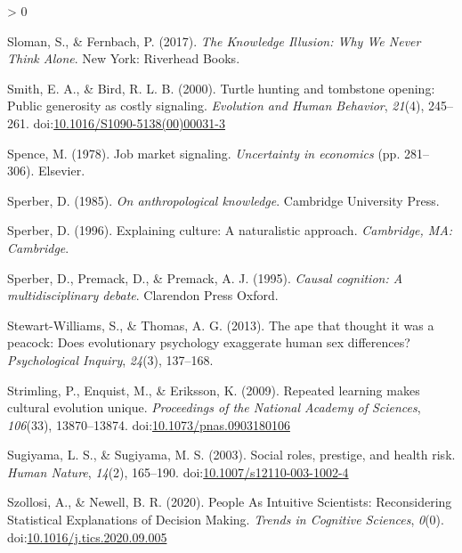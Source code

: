 \documentclass[
  11pt,
]{article}
\newlength{\cslhangindent}
\newenvironment{CSLReferences}[2] %
 {%
  \setlength{\parindent}{0pt}
  \ifodd #1 \everypar{\setlength{\hangindent}{\cslhangindent}}\ignorespaces\fi
  \ifnum #2 > 0
  \setlength{\parskip}{#2\baselineskip}
  \fi
 }%
 {}
\begin{document}
\begin{CSLReferences}{1}{0}
\leavevmode\hypertarget{ref-slomanKnowledgeIllusionWhy2017a}{}%
Sloman, S., \& Fernbach, P. (2017). \emph{The {Knowledge Illusion}: {Why We Never Think Alone}}. {New York}: {Riverhead Books}.

\leavevmode\hypertarget{ref-smithTurtleHuntingTombstone2000}{}%
Smith, E. A., \& Bird, R. L. B. (2000). Turtle hunting and tombstone opening: Public generosity as costly signaling. \emph{Evolution and Human Behavior}, \emph{21}(4), 245--261. doi:\href{https://doi.org/10.1016/S1090-5138(00)00031-3}{10.1016/S1090-5138(00)00031-3}

\leavevmode\hypertarget{ref-spenceJobMarketSignaling1978}{}%
Spence, M. (1978). Job market signaling. \emph{Uncertainty in economics} (pp. 281--306). {Elsevier}.

\leavevmode\hypertarget{ref-sperberAnthropologicalKnowledge1985}{}%
Sperber, D. (1985). \emph{On anthropological knowledge}. {Cambridge University Press}.

\leavevmode\hypertarget{ref-sperberExplainingCultureNaturalistic1996}{}%
Sperber, D. (1996). Explaining culture: {A} naturalistic approach. \emph{Cambridge, MA: Cambridge}.

\leavevmode\hypertarget{ref-sperberCausalCognitionMultidisciplinary1995}{}%
Sperber, D., Premack, D., \& Premack, A. J. (1995). \emph{Causal cognition: {A} multidisciplinary debate}. {Clarendon Press Oxford}.

\leavevmode\hypertarget{ref-stewart-williamsApeThatThought2013}{}%
Stewart-Williams, S., \& Thomas, A. G. (2013). The ape that thought it was a peacock: {Does} evolutionary psychology exaggerate human sex differences? \emph{Psychological Inquiry}, \emph{24}(3), 137--168.

\leavevmode\hypertarget{ref-strimlingRepeatedLearningMakes2009}{}%
Strimling, P., Enquist, M., \& Eriksson, K. (2009). Repeated learning makes cultural evolution unique. \emph{Proceedings of the National Academy of Sciences}, \emph{106}(33), 13870--13874. doi:\href{https://doi.org/10.1073/pnas.0903180106}{10.1073/pnas.0903180106}

\leavevmode\hypertarget{ref-sugiyamaSocialRolesPrestige2003}{}%
Sugiyama, L. S., \& Sugiyama, M. S. (2003). Social roles, prestige, and health risk. \emph{Human Nature}, \emph{14}(2), 165--190. doi:\href{https://doi.org/10.1007/s12110-003-1002-4}{10.1007/s12110-003-1002-4}

\leavevmode\hypertarget{ref-szollosiPeopleIntuitiveScientists2020}{}%
Szollosi, A., \& Newell, B. R. (2020). People {As Intuitive Scientists}: {Reconsidering Statistical Explanations} of {Decision Making}. \emph{Trends in Cognitive Sciences}, \emph{0}(0). doi:\href{https://doi.org/10.1016/j.tics.2020.09.005}{10.1016/j.tics.2020.09.005}


\end{CSLReferences}
\end{document}
